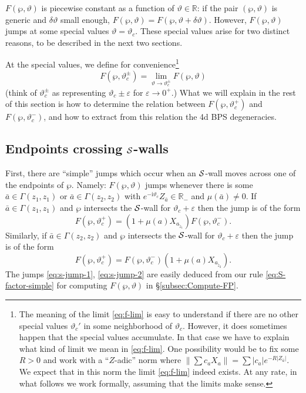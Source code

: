 \documentclass[11pt,a4paper]{article}
\def\R{{\mathbb{R}}}
\def\cS {{\cal S}}
\newcommand{\abs}[1]{\lvert#1\rvert}
\newcommand{\norm}[1]{\lVert#1\rVert}
\newcommand\I{{\mathrm i}}
\begin{document}
$F(\wp,\vartheta)$ is piecewise constant as a function of $\vartheta \in \R$:
if the pair $(\wp,\vartheta)$ is generic and $\delta \vartheta$ small enough,
$F(\wp,\vartheta) = F(\wp,\vartheta+\delta\vartheta)$.
However, $F(\wp,\vartheta)$ jumps at some special values
$\vartheta = \vartheta_c$.
These special values arise for two distinct reasons,
to be described in the next two sections.

At the special values, we define for convenience\footnote{The meaning of the limit \eqref{eq:f-lim} is easy to understand if there are no other special values
$\vartheta_c'$ in some neighborhood of $\vartheta_c$.  However, it does sometimes happen that the
special values accumulate.  In that case we have to explain what kind of limit we mean in \eqref{eq:f-lim}.
One possibility would be to fix some $R>0$ and work with a
``$Z$-adic'' norm where $\norm{\sum c_a X_{a}} = \sum \abs{c_a} e^{-R \abs{Z_{\bar a}}}$.  We expect that
in this norm the limit \eqref{eq:f-lim} indeed exists.  At any rate, in what follows we work formally,
assuming that the limits make sense.}
\begin{equation} \label{eq:f-lim}
F(\wp, \vartheta_c^\pm) = \lim_{\vartheta \to \vartheta_c^\pm} F(\wp, \vartheta)
\end{equation}
(think of $\vartheta_c^\pm$ as representing $\vartheta_c \pm \varepsilon$ for
$\varepsilon \to 0^+$.)
What we will explain in the rest of this section is how to determine the relation
between $F(\wp, \vartheta_c^+)$ and $F(\wp, \vartheta_c^-)$, and how to extract
from this relation the 4d BPS degeneracies.



\subsection{Endpoints crossing $\cS$-walls}

First, there are ``simple'' jumps which occur when an $\cS$-wall
moves across one of the endpoints of $\wp$.  Namely:
$F(\wp,\vartheta)$ jumps whenever there is some
$\bar a \in \Gamma(z_1,z_1)$ or $\bar a \in \Gamma(z_2,z_2)$
with $e^{-\I \vartheta_c} Z_{\bar a} \in \R_-$ and $\mu(\bar a) \neq 0$.
If $\bar a \in \Gamma(z_1,z_1)$ and $\wp$ intersects the $\cS$-wall for
$\vartheta_c + \varepsilon$ then the jump is of the form
\begin{equation} \label{eq:s-jump-1}
 F(\wp,\vartheta_c^+) = (1 + \mu(a) X_{a_{\tilde z_1}}) F(\wp,\vartheta_c^-).
\end{equation}
Similarly,  if $\bar a \in \Gamma(z_2,z_2)$ and $\wp$ intersects the $\cS$-wall for
$\vartheta_c + \varepsilon$ then the jump is of the form
\begin{equation} \label{eq:s-jump-2}
 F(\wp,\vartheta_c^+) = F(\wp,\vartheta_c^-) (1 + \mu(a) X_{a_{\tilde z_2}}).
\end{equation}
The jumps \eqref{eq:s-jump-1}, \eqref{eq:s-jump-2} are easily
deduced from our rule \eqref{eq:S-factor-simple} for
computing $F(\wp,\vartheta)$ in \S\ref{subsec:Compute-FP}.
\end{document}
